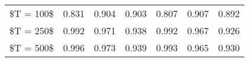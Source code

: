 % 
\begin{tabular}{ccccccc}
  \hline
  \hline
\$T = 100\$ & 0.831 & 0.904 & 0.903 & 0.807 & 0.907 & 0.892 \\ 
  \$T = 250\$ & 0.992 & 0.971 & 0.938 & 0.992 & 0.967 & 0.926 \\ 
  \$T = 500\$ & 0.996 & 0.973 & 0.939 & 0.993 & 0.965 & 0.930 \\ 
   \hline
\end{tabular}
